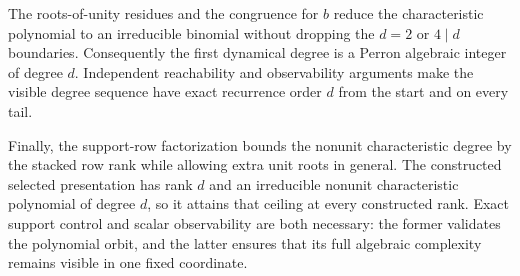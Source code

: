 \documentclass[11pt,letterpaper]{article}
\theoremstyle{plain}
\begin{document}
The roots-of-unity residues and the congruence for $b$ reduce the characteristic polynomial to an irreducible binomial without dropping the $d=2$ or $4\mid d$ boundaries.  Consequently the first dynamical degree is a Perron algebraic integer of degree $d$.  Independent reachability and observability arguments make the visible degree sequence have exact recurrence order $d$ from the start and on every tail.

Finally, the support-row factorization bounds the nonunit characteristic degree by the stacked row rank while allowing extra unit roots in general.  The constructed selected presentation has rank $d$ and an irreducible nonunit characteristic polynomial of degree $d$, so it attains that ceiling at every constructed rank.  Exact support control and scalar observability are both necessary: the former validates the polynomial orbit, and the latter ensures that its full algebraic complexity remains visible in one fixed coordinate.

\clearpage
{}


\end{document}
